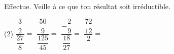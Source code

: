 %
%
Effectue. Veille à ce que ton résultat soit irréductible.
  \begin{tasks}(2)
    \task $\dfrac{\dfrac{3}{2}}{\dfrac{27}{8}}=$
    \task $\dfrac{\dfrac{50}{9}}{\dfrac{125}{45}}=$
    \task $\dfrac{-\dfrac{2}{9}}{\dfrac{18}{27}}=$
    \task $\dfrac{\dfrac{72}{12}}{2}=$
  \end{tasks}
